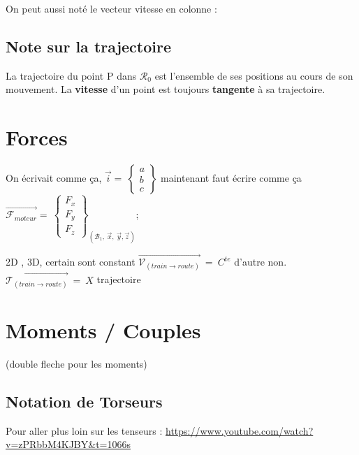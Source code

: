 \documentclass[
	11pt, %
	fleqn, %
	a4paper, %
]{LegrandOrangeBook}
\begin{document}
On peut aussi noté le vecteur vitesse en colonne :


\subsection*{Note sur la trajectoire}
La trajectoire du point P dans $\mathcal{R}_0$ est l’ensemble de ses positions au cours de son mouvement. La
\textbf{vitesse} d’un point est toujours \textbf{tangente} à sa trajectoire.


\section{Forces}
On écrivait comme ça,  $\Vec{i}=\ \begin{Bmatrix} a\\ b \\ c \end{Bmatrix} $  maintenant faut écrire comme ça 
 {$\overrightarrow{\mathcal{F}_{moteur}} =\ \begin{Bmatrix}
F_{x}\\
F_{y}\\
F_{z}
\end{Bmatrix}_{( \mathcal{B}_{1} ,\ \vec{x} ,\ \vec{y} ,\vec{z})}$};

2D , 3D, certain sont constant $\overrightarrow{\mathcal{V}_{(train\rightarrow route)}} \ =\ C^{te}$ d'autre non. $\overrightarrow{\mathcal{T}_{(train\rightarrow route)}} \ =\ X$ trajectoire

\section{Moments / Couples}
 (double fleche pour les moments) 






\subsection{Notation de Torseurs}


Pour aller plus loin sur les tenseurs : \url{https://www.youtube.com/watch?v=zPRbbM4KJBY&t=1066s}
\end{document}
